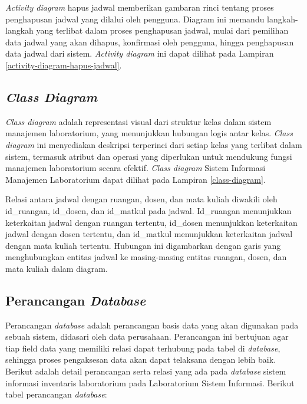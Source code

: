 \textit{Activity diagram} hapus jadwal memberikan gambaran rinci tentang proses penghapusan jadwal yang dilalui oleh pengguna. Diagram ini memandu langkah-langkah yang terlibat dalam proses penghapusan jadwal, mulai dari pemilihan data jadwal yang akan dihapus, konfirmasi oleh pengguna, hingga penghapusan data jadwal dari sistem. \textit{Activity diagram} ini dapat dilihat pada Lampiran \ref{activity-diagram-hapus-jadwal}.


\subsection{\textit{Class Diagram}}
\textit{Class diagram} adalah representasi visual dari struktur kelas dalam sistem manajemen laboratorium, yang menunjukkan hubungan logis antar kelas. \textit{Class diagram} ini menyediakan deskripsi terperinci dari setiap kelas yang terlibat dalam sistem, termasuk atribut dan operasi yang diperlukan untuk mendukung fungsi manajemen laboratorium secara efektif. \textit{Class diagram} Sistem Informasi Manajemen Laboratorium dapat dilihat pada Lampiran \ref{class-diagram}.

Relasi antara jadwal dengan ruangan, dosen, dan mata kuliah diwakili oleh id\_ruangan, id\_dosen, dan id\_matkul pada jadwal. Id\_ruangan menunjukkan keterkaitan jadwal dengan ruangan tertentu, id\_dosen menunjukkan keterkaitan jadwal dengan dosen tertentu, dan id\_matkul menunjukkan keterkaitan jadwal dengan mata kuliah tertentu. Hubungan ini digambarkan dengan garis yang menghubungkan entitas jadwal ke masing-masing entitas ruangan, dosen, dan mata kuliah dalam diagram.

\subsection{Perancangan \textit{Database}}
Perancangan \textit{database} adalah perancangan basis data yang akan digunakan pada sebuah sistem, didasari oleh data perusahaan. Perancangan ini bertujuan agar tiap field data yang memiliki relasi dapat terhubung pada tabel di \textit{database}, sehingga proses pengaksesan data akan dapat telaksana dengan lebih baik. Berikut adalah detail perancangan serta relasi yang ada pada \textit{database} sistem informasi inventaris laboratorium pada Laboratorium Sistem Informasi. Berikut tabel perancangan \textit{database}:

